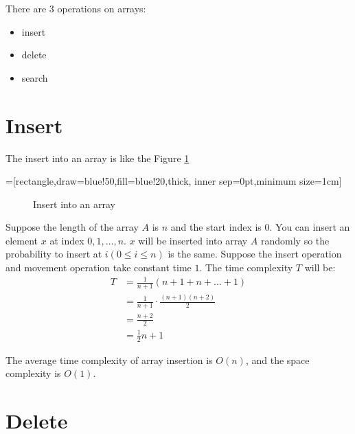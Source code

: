 \message{ !name(algorithms.tex)}\documentclass[a4paper,10pt]{book}
\begin{document}
There are 3 operations on arrays:
\begin{itemize}
\item insert
\item delete
\item search
\end{itemize}



\section{Insert}

The insert into an array is like the Figure \ref{fig:insert}


=[rectangle,draw=blue!50,fill=blue!20,thick, inner sep=0pt,minimum size=1cm]
\begin{figure}[!htp]
  \centering
  \caption{Insert into an array}
  \label{fig:insert}
\end{figure}

Suppose the length of the array \(A\) is \(n\) and the start index is \(0\).
You can insert an element \(x\) at index \(0, 1, \ldots, n\).
\(x\) will be inserted into array \(A\) randomly so the probability to insert at \(i (0 \le i \le n)\) is the same.
Suppose the insert operation and movement operation take constant time \(1\).
The time complexity \(T\) will be:
\begin{align*}
  \label{eq:1}
  T &= \frac{1}{n+1}(n+1 + n + \ldots + 1)\\
    &= \frac{1}{n+1} \cdot \frac{(n+1)(n+2)}{2}\\
    &= \frac{n+2}{2}\\
    &= \frac{1}{2} n + 1
\end{align*}


The average time complexity of array insertion is $O(n)$, and the space complexity is $O(1)$.


\section{Delete}
\end{document}
